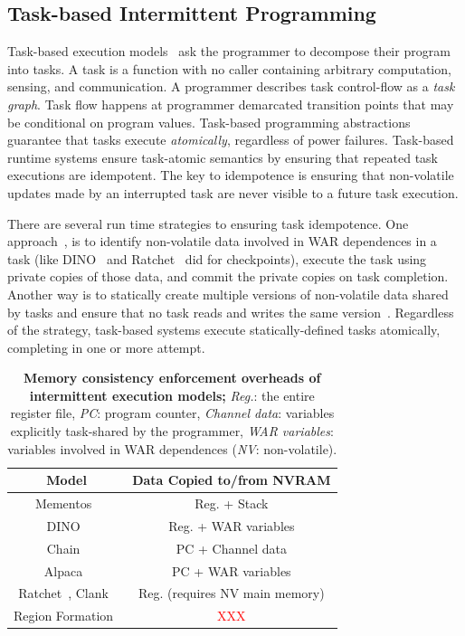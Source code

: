 \subsection{Task-based Intermittent Programming}
\label{section:background_task_computing}

Task-based execution models~\cite{dino,chain,alpaca} ask the programmer to decompose their program into tasks. A task is a function with no caller containing arbitrary computation, sensing, and communication. A programmer describes task control-flow as a {\em task graph}. Task flow happens at programmer demarcated transition points that may be conditional on program values. Task-based programming abstractions guarantee that tasks execute {\em atomically}, regardless of power failures. Task-based runtime systems ensure task-atomic semantics by ensuring that repeated task executions are idempotent. The key to idempotence is ensuring that non-volatile updates made by an interrupted task are never visible to a future task execution.  

There are several run time strategies to ensuring task idempotence. One approach~\cite{alpaca}, is to identify non-volatile data involved in WAR dependences in a task (like DINO~\cite{dino} and Ratchet~\cite{ratchet} did for checkpoints), execute the task using private copies of those data, and commit the private copies on task completion. Another way is to statically create multiple versions of non-volatile data shared by tasks and ensure that no task reads and writes the same version~\cite{chain}. Regardless of the strategy, task-based systems execute statically-defined tasks atomically, completing in one or more attempt. 

\begin{table}
	\centering
	\footnotesize
	\begin{tabular}{|c|c|}
		\hline
		Model & Data Copied to/from NVRAM \\
		\hline\hline
		Mementos~\cite{mementos}                             & Reg. + Stack     \\
		DINO~\cite{dino}                                     & Reg. + WAR variables \\
		Chain~\cite{chain}                                   & PC   + Channel data\\
		Alpaca~\cite{alpaca}                                 & PC   + WAR variables \\
		Ratchet~\cite{ratchet}, Clank~\cite{hicks_isca_2017} & Reg. (requires NV main memory) \\
		Region Formation~\cite{baghsorkhi_cgo_2018} & \textcolor{red}{XXX} \\
		\hline
	\end{tabular}
	\caption{\textbf{Memory consistency enforcement overheads of intermittent execution models;} \emph{Reg.}: the entire register file, \emph{PC}: program counter, \emph{Channel data}: variables explicitly task-shared by the programmer, \emph{WAR variables}: variables involved in WAR dependences (\emph{NV}: non-volatile).}
	\label{table:chechpoint_comparison}
\end{table}


